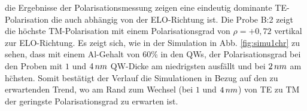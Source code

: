 %
die Ergebnisse der Polarisationsmessung zeigen eine eindeutig dominante TE-Polarisation die auch abh\"angig von der ELO-Richtung ist. Die Probe B:2 zeigt die h\"ochste TM-Polarisation mit einem Polarisationsgrad von $\rho=+0,72$ vertikal zur ELO-Richtung. Es zeigt sich, wie in der Simulation
in Abb. \ref{fig:simu1chr} zu sehen, dass mit einem Al-Gehalt von $60$\% in den QWs, der Polarisationsgrad bei den Proben mit $1$ und $4 \thinspace nm$ QW-Dicke am niedrigsten ausf\"allt und bei $2 \thinspace nm$ am h\"chsten. Somit best\"atigt der Verlauf die Simulationen in Bezug auf den zu erwartenden Trend, wo am Rand zum Wechsel (bei $1$ und $4 \thinspace nm$) von TE zu TM der geringste Polarisationsgrad zu erwarten ist.
